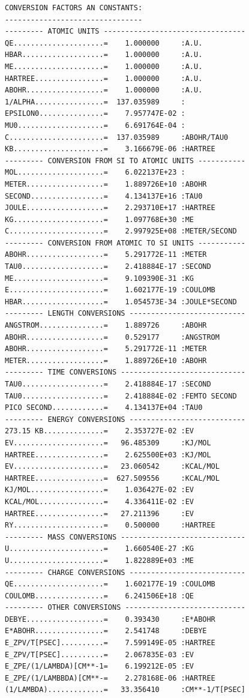 \documentclass[final,12pt]{article}
\begin{document}
{{{{{{\begin{verbatim}
CONVERSION FACTORS AN CONSTANTS:
--------------------------------
--------- ATOMIC UNITS ---------------------------------
QE.....................=    1.000000     :A.U.
HBAR...................=    1.000000     :A.U.
ME.....................=    1.000000     :A.U.
HARTREE................=    1.000000     :A.U.
ABOHR..................=    1.000000     :A.U.
1/ALPHA................=  137.035989     :
EPSILON0...............=    7.957747E-02 :
MU0....................=    6.691764E-04 :
C......................=  137.035989     :ABOHR/TAU0
KB.....................=    3.166679E-06 :HARTREE
--------- CONVERSION FROM SI TO ATOMIC UNITS -----------
MOL....................=    6.022137E+23 :
METER..................=    1.889726E+10 :ABOHR
SECOND.................=    4.134137E+16 :TAU0
JOULE..................=    2.293710E+17 :HARTREE
KG.....................=    1.097768E+30 :ME
C......................=    2.997925E+08 :METER/SECOND
--------- CONVERSION FROM ATOMIC TO SI UNITS -----------
ABOHR..................=    5.291772E-11 :METER
TAU0...................=    2.418884E-17 :SECOND
ME.....................=    9.109390E-31 :KG
E......................=    1.602177E-19 :COULOMB
HBAR...................=    1.054573E-34 :JOULE*SECOND
--------- LENGTH CONVERSIONS ---------------------------
ANGSTROM...............=    1.889726     :ABOHR
ABOHR..................=    0.529177     :ANGSTROM
ABOHR..................=    5.291772E-11 :METER
METER..................=    1.889726E+10 :ABOHR
--------- TIME CONVERSIONS -----------------------------
TAU0...................=    2.418884E-17 :SECOND
TAU0...................=    2.418884E-02 :FEMTO SECOND
PICO SECOND............=    4.134137E+04 :TAU0
--------- ENERGY CONVERSIONS ---------------------------
273.15 KB..............=    2.353727E-02 :EV
EV.....................=   96.485309     :KJ/MOL
HARTREE................=    2.625500E+03 :KJ/MOL
EV.....................=   23.060542     :KCAL/MOL
HARTREE................=  627.509556     :KCAL/MOL
KJ/MOL.................=    1.036427E-02 :EV
KCAL/MOL...............=    4.336411E-02 :EV
HARTREE................=   27.211396     :EV
RY.....................=    0.500000     :HARTREE
--------- MASS CONVERSIONS -----------------------------
U......................=    1.660540E-27 :KG
U......................=    1.822889E+03 :ME
--------- CHARGE CONVERSIONS ---------------------------
QE.....................=    1.602177E-19 :COULOMB
COULOMB................=    6.241506E+18 :QE
--------- OTHER CONVERSIONS ----------------------------
DEBYE..................=    0.393430     :E*ABOHR
E*ABOHR................=    2.541748     :DEBYE
E_ZPV/T[PSEC]..........=    7.599149E-05 :HARTREE
E_ZPV/T[PSEC]..........=    2.067835E-03 :EV
E_ZPE/(1/LAMBDA)[CM**-1=    6.199212E-05 :EV
E_ZPE/(1/LAMBBDA)[CM**-=    2.278168E-06 :HARTREE
(1/LAMBDA).............=   33.356410     :CM**-1/T[PSEC]


\end{verbatim}}}}}}}
\end{document}
